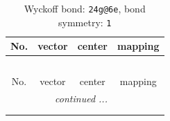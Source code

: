 \documentclass[fleqn,8pt]{jsarticle}
\begin{document}
\renewcommand{\arraystretch}{1.2}
\begin{longtable}{cccc}
\caption{Wyckoff bond: {\tt 24g@6e}, bond symmetry: {\tt 1}}
 \\
 \hline \hline
No. & vector & center & mapping \\ \hline \endfirsthead

\multicolumn{3}{l}{\tablename\ \thetable{}} \\
 \hline \hline
No. & vector & center & mapping \\ \hline \endhead

 \hline \hline
\multicolumn{3}{r}{\footnotesize\it continued ...} \\ \endfoot

 \hline \hline
\multicolumn{3}{r}{} \\ \endlastfoot


\end{longtable}
\end{document}
